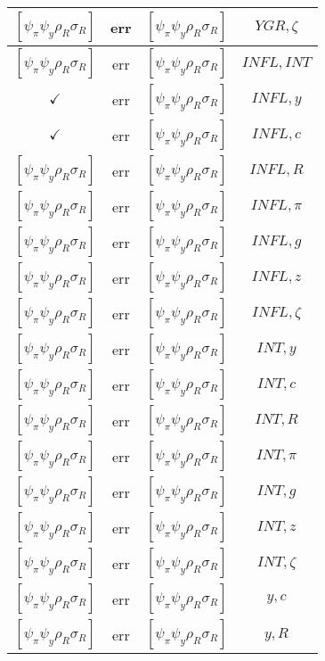 \documentclass[a4paper,10pt]{article}
\begin{document}
\begin{longtable}{|c|c|c|c|}
\hline
$[\psi_\pi \psi_y \rho_R \sigma_R ]$ & err & $[\psi_\pi \psi_y \rho_R \sigma_R ]$ & ${YGR},{\zeta}$ \\
\hline
$[\psi_\pi \psi_y \rho_R \sigma_R ]$ & err & $[\psi_\pi \psi_y \rho_R \sigma_R ]$ & ${INFL},{INT}$ \\
\hline
$\checkmark$ & err & $[\psi_\pi \psi_y \rho_R \sigma_R ]$ & ${INFL},{y}$ \\
\hline
$\checkmark$ & err & $[\psi_\pi \psi_y \rho_R \sigma_R ]$ & ${INFL},{c}$ \\
\hline
$[\psi_\pi \psi_y \rho_R \sigma_R ]$ & err & $[\psi_\pi \psi_y \rho_R \sigma_R ]$ & ${INFL},{R}$ \\
\hline
$[\psi_\pi \psi_y \rho_R \sigma_R ]$ & err & $[\psi_\pi \psi_y \rho_R \sigma_R ]$ & ${INFL},{\pi}$ \\
\hline
$[\psi_\pi \psi_y \rho_R \sigma_R ]$ & err & $[\psi_\pi \psi_y \rho_R \sigma_R ]$ & ${INFL},{g}$ \\
\hline
$[\psi_\pi \psi_y \rho_R \sigma_R ]$ & err & $[\psi_\pi \psi_y \rho_R \sigma_R ]$ & ${INFL},{z}$ \\
\hline
$[\psi_\pi \psi_y \rho_R \sigma_R ]$ & err & $[\psi_\pi \psi_y \rho_R \sigma_R ]$ & ${INFL},{\zeta}$ \\
\hline
$[\psi_\pi \psi_y \rho_R \sigma_R ]$ & err & $[\psi_\pi \psi_y \rho_R \sigma_R ]$ & ${INT},{y}$ \\
\hline
$[\psi_\pi \psi_y \rho_R \sigma_R ]$ & err & $[\psi_\pi \psi_y \rho_R \sigma_R ]$ & ${INT},{c}$ \\
\hline
$[\psi_\pi \psi_y \rho_R \sigma_R ]$ & err & $[\psi_\pi \psi_y \rho_R \sigma_R ]$ & ${INT},{R}$ \\
\hline
$[\psi_\pi \psi_y \rho_R \sigma_R ]$ & err & $[\psi_\pi \psi_y \rho_R \sigma_R ]$ & ${INT},{\pi}$ \\
\hline
$[\psi_\pi \psi_y \rho_R \sigma_R ]$ & err & $[\psi_\pi \psi_y \rho_R \sigma_R ]$ & ${INT},{g}$ \\
\hline
$[\psi_\pi \psi_y \rho_R \sigma_R ]$ & err & $[\psi_\pi \psi_y \rho_R \sigma_R ]$ & ${INT},{z}$ \\
\hline
$[\psi_\pi \psi_y \rho_R \sigma_R ]$ & err & $[\psi_\pi \psi_y \rho_R \sigma_R ]$ & ${INT},{\zeta}$ \\
\hline
$[\psi_\pi \psi_y \rho_R \sigma_R ]$ & err & $[\psi_\pi \psi_y \rho_R \sigma_R ]$ & ${y},{c}$ \\
\hline
$[\psi_\pi \psi_y \rho_R \sigma_R ]$ & err & $[\psi_\pi \psi_y \rho_R \sigma_R ]$ & ${y},{R}$ \\

\end{longtable}
\end{document}
